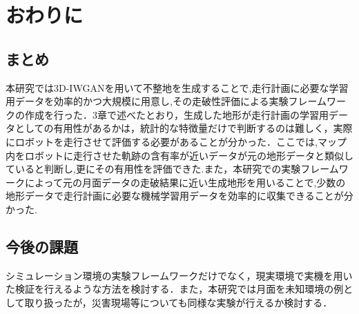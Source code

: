 \documentclass[uplatex,twocolumn, dvipdfmx]{jsarticle}  %
\begin{document}
\section{おわりに}

\subsection{まとめ}
本研究では3D-IWGANを用いて不整地を生成することで,走行計画に必要な学習用データを効率的かつ大規模に用意し,その走破性評価による実験フレームワークの作成を行った．3章で述べたとおり，生成した地形が走行計画の学習用データとしての有用性があるかは，統計的な特徴量だけで判断するのは難しく，実際にロボットを走行させて評価する必要があることが分かった．ここでは,マップ内をロボットに走行させた軌跡の含有率が近いデータが元の地形データと類似していると判断し,更にその有用性を評価できた.また，本研究での実験フレームワークによって元の月面データの走破結果に近い生成地形を用いることで,少数の地形データで走行計画に必要な機械学習用データを効率的に収集できることが分かった.


\subsection{今後の課題}
シミュレーション環境の実験フレームワークだけでなく，現実環境で実機を用いた検証を行えるような方法を検討する．また，本研究では月面を未知環境の例として取り扱ったが，災害現場等についても同様な実験が行えるか検討する．





\end{document}

